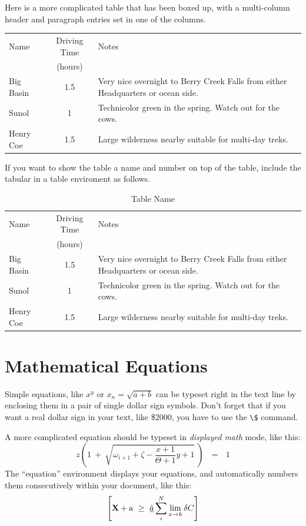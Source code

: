 \documentclass[11pt]{article}
\begin{document}
Here is a more complicated table that has been boxed up, with a multi-column
header and paragraph entries set in one of the columns.
\begin{center}
\begin{tabular}{|l|c|p{3.5in}|}
\hline
Name&Driving Time&Notes\\
&(hours)&\\ \hline
Big Basin&1.5&Very nice overnight to Berry Creek Falls from
either Headquarters or ocean side.\\ \hline
Sunol&1&Technicolor green in the spring.  Watch out for the cows.\\ \hline
Henry Coe&1.5&Large wilderness nearby suitable for multi-day treks.\\ \hline
\end{tabular}
\end{center}

If you want to show the table a name and number on top of the table, include the tabular in a table enviroment as follows.
\begin{table}
\caption{Table Name}
\begin{center}
\begin{tabular}{|l|c|p{3.5in}|}
\hline
Name&Driving Time&Notes\\
&(hours)&\\ \hline
Big Basin&1.5&Very nice overnight to Berry Creek Falls from
either Headquarters or ocean side.\\ \hline
Sunol&1&Technicolor green in the spring.  Watch out for the cows.\\ \hline
Henry Coe&1.5&Large wilderness nearby suitable for multi-day treks.\\ \hline
\end{tabular}
\end{center}
\end{table}


\section {Mathematical Equations}
Simple equations, like $x^y$ or $x_n = \sqrt{a + b}$ can be typeset right
in the text line by enclosing them in a pair of single dollar sign symbols.
Don't forget that if you want a real dollar sign in your text, like \$2000,
you have to use the \verb+\$+ command.

A more complicated equation should be typeset in {\em displayed math\/} mode,
like this:
\[
z \left( 1 \ +\  \sqrt{\omega_{i+1} + \zeta -\frac{x+1}{\Theta +1} y + 1} 
\ \right)
\ \ \ =\ \ \  1
\]
The ``equation'' environment displays your equations, and automatically
numbers them consecutively within your document, like this:
\begin{equation}
\left[
{\bf X} + {\rm a} \ \geq\ 
\underline{\hat a} \sum_i^N \lim_{x \rightarrow k} \delta C
\right]
\end{equation}
\end{document}
